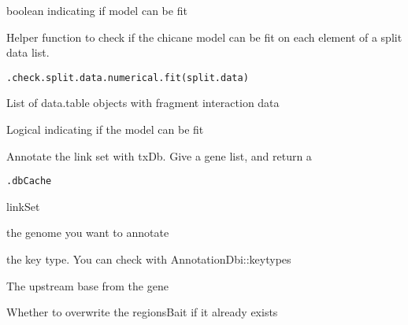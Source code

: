 \documentclass[letterpaper]{book}
\begin{document}
%
\begin{Value}
boolean indicating if model can be fit
\end{Value}
%
\begin{Description}
Helper function to check if the chicane model can be fit on each element of a split data list.
\end{Description}
%
\begin{Usage}
\begin{verbatim}
.check.split.data.numerical.fit(split.data)
\end{verbatim}
\end{Usage}
%
\begin{Arguments}
\begin{ldescription}
\item[\code{split.data}] List of data.table objects with fragment interaction data
\end{ldescription}
\end{Arguments}
%
\begin{Value}
Logical indicating if the model can be fit
\end{Value}
%
\begin{Description}
Annotate the link set with txDb. Give a gene list, and return a
\end{Description}
%
\begin{Usage}
\begin{verbatim}
.dbCache
\end{verbatim}
\end{Usage}
%
\begin{Arguments}
\begin{ldescription}
\item[\code{x}] linkSet

\item[\code{genome}] the genome you want to annotate

\item[\code{keyType}] the key type. You can check with AnnotationDbi::keytypes

\item[\code{upstream}] The upstream base from the gene

\item[\code{overwrite}] Whether to overwrite the regionsBait if it already exists
\end{ldescription}
\end{Arguments}
\end{document}
